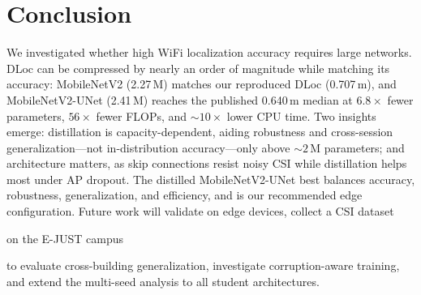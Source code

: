 \documentclass[conference,a4paper]{IEEEtran}
\newif\ifanonymous
\begin{document}
\section{Conclusion}
We investigated whether high WiFi localization accuracy requires large networks. DLoc can be compressed by nearly an order of magnitude while matching its accuracy: MobileNetV2 (2.27\,M) matches our reproduced DLoc (0.707\,m), and MobileNetV2-UNet (2.41\,M) reaches the published 0.640\,m median at $6.8\times$ fewer parameters, $56\times$ fewer FLOPs, and ${\sim}10\times$ lower CPU time. Two insights emerge: distillation is capacity-dependent, aiding robustness and cross-session generalization---not in-distribution accuracy---only above ${\sim}2$\,M parameters; and architecture matters, as skip connections resist noisy CSI while distillation helps most under AP dropout. The distilled MobileNetV2-UNet best balances accuracy, robustness, generalization, and efficiency, and is our recommended edge configuration. Future work will validate on edge devices, collect a CSI dataset
\ifanonymous
in a different building
\else
on the E-JUST campus
\fi
to evaluate cross-building generalization, investigate corruption-aware training, and extend the multi-seed analysis to all student architectures.

\let\oldthebibliography\thebibliography
\renewcommand{\thebibliography}[1]{\oldthebibliography{#1}\scriptsize\raggedright\setlength{\itemsep}{0pt}\setlength{\parsep}{0pt}}


\end{document}

